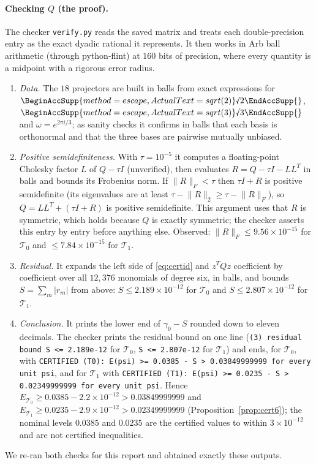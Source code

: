\documentclass[11pt]{article}
\newcommand{\rnum}[1]{\BeginAccSupp{method=escape,ActualText=sqrt(#1)}\text{\textsurd}#1\EndAccSupp{}}
\newcommand{\abs}[1]{\lvert #1\rvert}
\newcommand{\norm}[1]{\lVert #1\rVert}
\newcommand{\Tz}{\mathcal{T}_0}          %
\newcommand{\To}{\mathcal{T}_1}          %
\newcommand{\E}{E}                       %
\theoremstyle{definition}
\theoremstyle{remark}
\begin{document}
\paragraph{Checking $Q$ (the proof).} The checker \texttt{verify.py} reads the saved matrix and treats each
double-precision entry as the exact dyadic rational it represents. It then works in Arb ball arithmetic (through
python-flint) at $160$ bits of precision, where every quantity is a midpoint with a rigorous error radius.
\begin{enumerate}[label=(\arabic*)]
\item \emph{Data.} The $18$ projectors are built in balls from exact expressions for $\rnum{2}$, $\rnum{3}$ and
      $\omega=e^{2\pi i/3}$; as sanity checks it confirms in balls that each basis is orthonormal and that the
      three bases are pairwise mutually unbiased.
\item \emph{Positive semidefiniteness.} With $\tau=10^{-5}$ it computes a floating-point Cholesky factor $L$ of
      $Q-\tau I$ (unverified), then evaluates $R=Q-\tau I-LL^{T}$ in balls and bounds its Frobenius norm. If
      $\norm{R}_F<\tau$ then $\tau I+R$ is positive semidefinite (its eigenvalues are at least
      $\tau-\norm{R}_2\ge\tau-\norm R_F$), so $Q=LL^{T}+(\tau I+R)$ is positive semidefinite. This argument uses that $R$ is symmetric, which holds because $Q$ is
exactly symmetric; the checker asserts this entry by entry before anything else. Observed:
      $\norm{R}_F\le9.56\times10^{-15}$ for $\Tz$ and $\le7.84\times10^{-15}$ for $\To$.
\item \emph{Residual.} It expands the left side of \eqref{eq:certid} and $z^{T}Qz$ coefficient by coefficient over
      all $12{,}376$ monomials of degree six, in balls, and bounds $S=\sum_m\abs{r_m}$ from above: $S\le2.189\times10^{-12}$
      for $\Tz$ and $S\le2.807\times10^{-12}$ for $\To$.
\item \emph{Conclusion.} It prints the lower end of $\gamma_0-S$ rounded down to eleven decimals. The checker prints the residual bound on one line (\texttt{(3) residual bound S <= 2.189e-12} for $\Tz$,
      \texttt{S <= 2.807e-12} for $\To$) and ends, for $\Tz$, with
      \texttt{CERTIFIED (T0): E(psi) >= 0.0385 -~S > 0.03849999999 for every unit psi}, and for
      $\To$ with \texttt{CERTIFIED (T1): E(psi) >= 0.0235 -~S > 0.02349999999 for every unit psi}.
      Hence $\E_{\Tz}\ge0.0385-2.2\times10^{-12}>0.03849999999$ and $\E_{\To}\ge0.0235-2.9\times10^{-12}>0.02349999999$
      (Proposition~\ref{prop:cert6}); the nominal levels $0.0385$ and $0.0235$ are the certified values to within
      $3\times10^{-12}$ and are not certified inequalities.
\end{enumerate}
We re-ran both checks for this report and obtained exactly these outputs.
\end{document}
